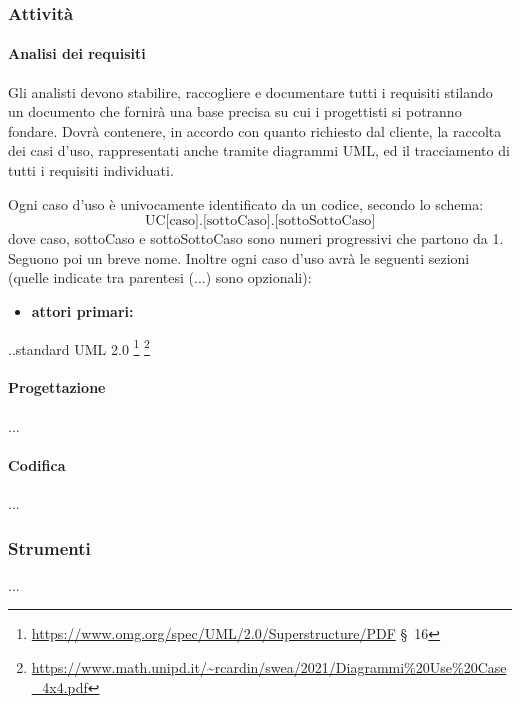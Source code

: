     \subsubsection{Attività}
        \paragraph{Analisi dei requisiti}
                Gli analisti devono stabilire, raccogliere e documentare tutti i requisiti stilando un documento che fornirà una base precisa su cui i progettisti si potranno fondare. Dovrà contenere, in accordo con quanto richiesto dal cliente, la raccolta dei casi d'uso, rappresentati anche tramite diagrammi UML, ed il tracciamento di tutti i requisiti individuati.

                Ogni caso d'uso è univocamente identificato da un codice, secondo lo schema:
                $$\text{UC[caso].[sottoCaso].[sottoSottoCaso]}$$ dove caso, sottoCaso e sottoSottoCaso sono numeri progressivi che partono da 1. Seguono poi un breve nome. Inoltre ogni caso d'uso avrà le seguenti sezioni (quelle indicate tra parentesi (...) sono opzionali):
                \begin{itemize}
                    \item \textbf{attori primari: }
                \end{itemize}

                ..standard UML 2.0 \footnote{\url{https://www.omg.org/spec/UML/2.0/Superstructure/PDF} \S\ 16} \footnote{\url{https://www.math.unipd.it/~rcardin/swea/2021/Diagrammi\%20Use\%20Case_4x4.pdf}}

        \paragraph{Progettazione}
            ...
        \paragraph{Codifica}
            ...
    \subsubsection{Strumenti}
        ...